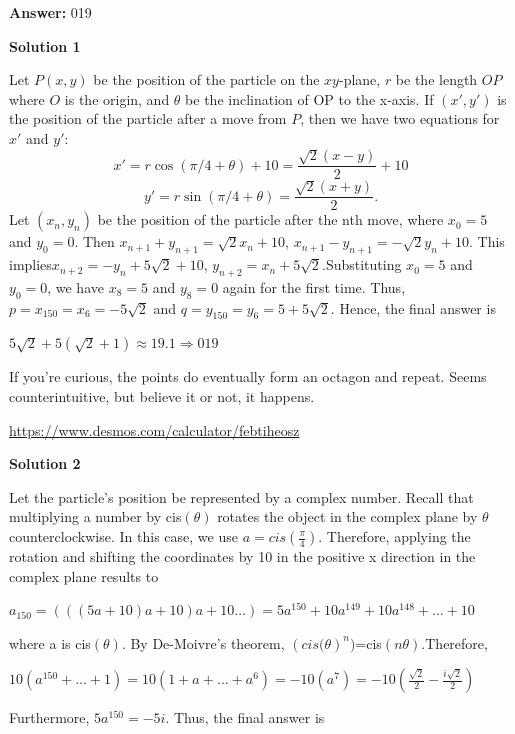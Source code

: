 \begin{enumerate}
 
 \textbf{Answer: }019



\textbf{Solution 1}

Let $P(x, y)$ be the position of the particle on the $xy$-plane, $r$ be the length $OP$ where $O$ is the origin, and $\theta$ be the inclination of OP to the x-axis. If $(x', y')$ is the position of the particle after a move from $P$, then we have two equations for $x'$ and $y'$:
 \[x'=r\cos(\pi/4+\theta)+10 = \frac{\sqrt{2}(x - y)}{2} + 10\]
 \[y' = r\sin(\pi/4+\theta) = \frac{\sqrt{2}(x + y)}{2}.\]Let $(x_n, y_n)$ be the position of the particle after the nth move, where $x_0 = 5$ and $y_0 = 0$. Then $x_{n+1} + y_{n+1} =  \sqrt{2}x_n+10$, $x_{n+1} - y_{n+1} = -\sqrt{2}y_n+10$. This implies$x_{n+2} = -y_n + 5\sqrt{2}+ 10$, $y_{n+2}=x_n + 5\sqrt{2}$.Substituting $x_0 = 5$ and $y_0 = 0$, we have $x_8 = 5$ and $y_8 = 0$ again for the first time. Thus, $p = x_{150} = x_6 = -5\sqrt{2}$ and $q = y_{150} = y_6 = 5 + 5\sqrt{2}$. Hence, the final answer is

 $5\sqrt {2} + 5(\sqrt {2} + 1) \approx 19.1 \Longrightarrow \boxed{019}$

 If you're curious, the points do eventually form an octagon and repeat. Seems counterintuitive, but believe it or not, it happens.

 \href{https://www.desmos.com/calculator/febtiheosz}{https://www.desmos.com/calculator/febtiheosz}

 



\textbf{Solution 2}

Let the particle's position be represented by a complex number. Recall that multiplying a number by cis$\left( \theta \right)$ rotates the object in the complex plane by $\theta$ counterclockwise. In this case, we use $a = cis(\frac{\pi}{4})$. Therefore, applying the rotation and shifting the coordinates by 10 in the positive x direction in the complex plane results to

 $a_{150} = (((5a + 10)a + 10)a + 10 \ldots) = 5a^{150} + 10 a^{149} + 10a^{148}+ \ldots + 10$

 where a is cis$\left( \theta \right)$. By De-Moivre's theorem, $\left(cis( \theta \right)^n )$=cis$\left(n \theta \right)$.Therefore,

 $10(a^{150} + \ldots + 1)= 10(1 + a + \ldots + a^6) = - 10(a^7) = - 10(\frac{ \sqrt {2} }{2} - \frac{i\sqrt {2}} {2})$

 Furthermore, $5a^{150} = - 5i$. Thus, the final answer is


\end{enumerate}
